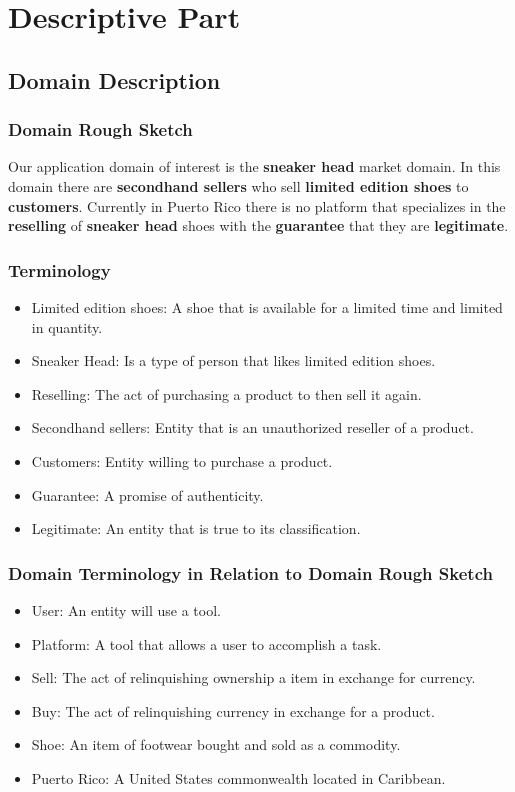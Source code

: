 \chapter{Descriptive Part}
\newpage
\section{Domain Description}
\subsection{Domain Rough Sketch}
Our application domain of interest is the \textbf{sneaker head} market domain. In this domain there are \textbf{secondhand sellers} who sell \textbf{limited edition shoes} to \textbf{customers}. Currently in Puerto Rico there is no platform that specializes in the \textbf{reselling} of \textbf{sneaker head} shoes with the \textbf{guarantee} that they are \textbf{legitimate}.
\subsection{Terminology}
\begin{itemize}
    \item Limited edition shoes: A shoe that is available for a limited time and limited in quantity.
    \item Sneaker Head: Is a type of person that likes limited edition shoes.
    \item Reselling: The act of purchasing a product to then sell it again.
    \item Secondhand sellers: Entity that is an unauthorized reseller of a product.
    \item Customers: Entity willing to purchase a product.
    \item Guarantee: A promise of authenticity.
    \item Legitimate: An entity that is true to its classification.
\end{itemize}
\subsection{Domain Terminology in Relation to Domain Rough Sketch}
\begin{itemize}
  \item User: An entity will use a tool.
  \item Platform: A tool that allows a user to accomplish a task.
  \item Sell: The act of relinquishing ownership a item in exchange for currency.
  \item Buy: The act of relinquishing currency in exchange for a product.
  \item Shoe: An item of footwear bought and sold as a commodity.
  \item Puerto Rico: A United States commonwealth located in Caribbean.
\end{itemize}

